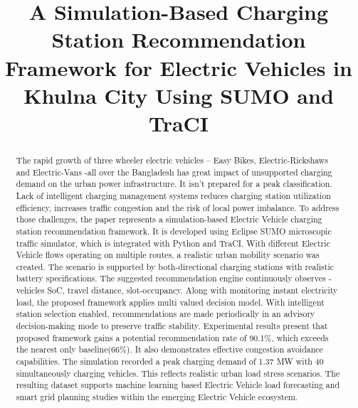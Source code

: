 \documentclass[conference]{IEEEtran}
\begin{document}
\title{A Simulation-Based Charging Station Recommendation Framework for
Electric Vehicles in Khulna City Using SUMO and TraCI}

\author{
}

\maketitle

\begin{abstract}
The rapid growth of three wheeler electric vehicles -- Easy Bikes,
Electric-Rickshaws and Electric-Vans -all over the 
Bangladesh has great impact of unsupported charging demand on the urban
power infrastructure. It isn't prepared for a peak classification. Lack
of intelligent charging management systems reduces charging station
utilization efficiency, increases traffic congestion and the risk of
local power imbalance. To address those challenges, the paper represents
a simulation-based Electric Vehicle charging station recommendation
framework. It is developed using Eclipse SUMO microscopic traffic
simulator, which is integrated with Python and TraCI. With different
Electric Vehicle flows operating on multiple routes, a realistic urban
mobility scenario was created. The scenario is supported by
both-directional charging stations with realistic battery
specifications. The suggested recommendation engine continuously
observes -vehicles SoC, travel distance, slot-occupancy. Along with
monitoring instant electricity load, the proposed framework applies
multi valued decision model. With intelligent station selection enabled,
recommendations are made periodically in an advisory decision-making
mode to preserve traffic stability. Experimental results present that
proposed framework gains a potential recommendation rate of 90.1\%,
which exceeds the nearest only baseline(66\%). It also demonstrates
effective congestion avoidance capabilities. The simulation recorded a
peak charging demand of 1.37 MW with 40 simultaneously charging
vehicles. This reflects realistic urban load stress scenarios. The
resulting dataset supports machine learning based Electric Vehicle load
forecasting and smart grid planning studies \cite{b8} within the emerging Electric
Vehicle ecosystem.
\end{abstract}
\end{document}
